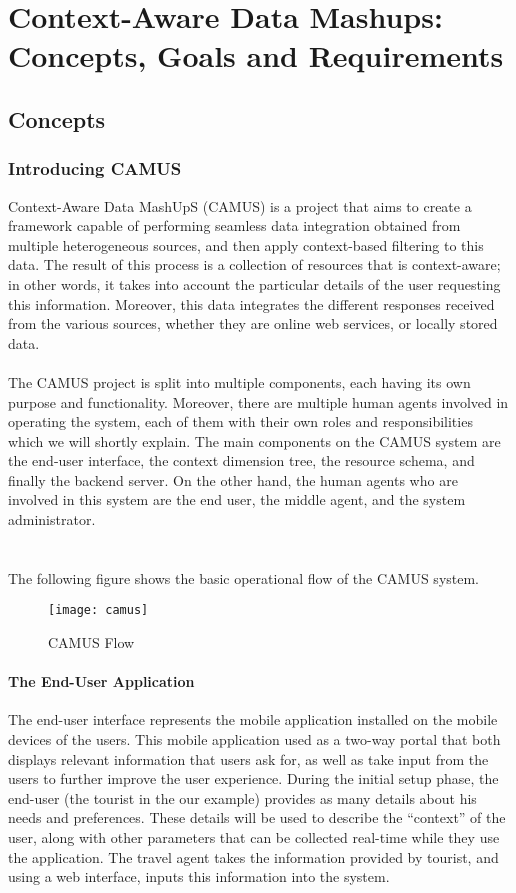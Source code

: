 \chapter{Context-Aware Data Mashups: Concepts, Goals and Requirements}
\label{capitolo3}
\thispagestyle{empty}

\section{Concepts}
\subsection{Introducing CAMUS}
Context-Aware Data MashUpS (CAMUS)\cite{camus} is a project that aims to create a framework capable of performing seamless data integration obtained from multiple heterogeneous sources, and then apply context-based filtering to this data. The result of this process is a collection of resources that is context-aware; in other words, it takes into account the particular details of the user requesting this information. Moreover, this data integrates the different responses received from the various sources, whether they are online web services, or locally stored data.\\\\
The CAMUS project is split into multiple components, each having its own purpose and functionality. Moreover, there are multiple human agents involved in operating the system, each of them with their own roles and responsibilities which we will shortly explain. The main components on the CAMUS system are the end-user interface, the context dimension tree, the resource schema, and finally the backend server. On the other hand, the human agents who are involved in this system are the end user, the middle agent, and the system administrator.\\\\\\
The following figure shows the basic operational flow of the CAMUS system.
\begin{figure}[h]
\texttt{[image: camus]}
\caption{CAMUS Flow}
\end{figure}
\subsubsection{The End-User Application}
The end-user interface represents the mobile application installed on the mobile devices of the users. This mobile application used as a two-way portal that both displays relevant information that users ask for, as well as take input from the users to further improve the user experience. During the initial setup phase, the end-user (the tourist in the our example) provides as many details about his needs and preferences. These details will be used to describe the ``context'' of the user, along with other parameters that can be collected real-time while they use the application. The travel agent takes the information provided by tourist, and using a web interface, inputs this information into the system.
